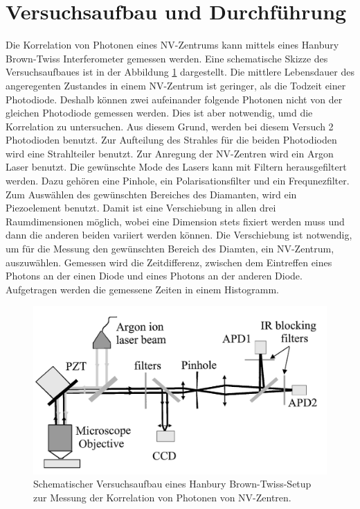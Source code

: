 \section{Versuchsaufbau und Durchf\"uhrung}
Die Korrelation von Photonen eines NV-Zentrums kann mittels eines  Hanbury Brown-Twiss Interferometer
gemessen werden. Eine schematische Skizze des Versuchsaufbaues ist in der Abbildung \ref{fig:Versuchsaufbau} dargestellt. 
Die mittlere Lebensdauer des angeregenten Zustandes in einem NV-Zentrum ist geringer, als die Todzeit einer Photodiode. 
Deshalb k\"onnen zwei aufeinander folgende Photonen nicht von der gleichen Photodiode gemessen werden. 
Dies ist aber notwendig, umd die Korrelation zu untersuchen. Aus diesem Grund, werden bei diesem Versuch 2 Photodioden benutzt. 
Zur Aufteilung des Strahles für die beiden Photodioden wird eine Strahlteiler benutzt. Zur Anregung der NV-Zentren wird ein Argon Laser benutzt. 
Die gewünschte Mode des Lasers kann mit Filtern herausgefiltert werden. Dazu gehören eine Pinhole, ein Polarisationsfilter und ein Frequnezfilter.  
Zum Ausw\"ahlen des gew\"unschten Bereiches des Diamanten, wird ein Piezoelement benutzt. 
Damit ist eine Verschiebung in allen drei Raumdimensionen m\"oglich, wobei eine Dimension stets fixiert werden muss und dann die anderen beiden variiert werden k\"onnen. 
Die Verschiebung ist notwendig, um f\"ur die Messung den gew\"unschten Bereich des Diamten, ein NV-Zentrum, auszuw\"ahlen. Gemessen wird die Zeitdifferenz, zwischen dem Eintreffen eines Photons an der einen Diode und eines Photons an der anderen Diode. 
Aufgetragen werden die gemessene Zeiten in einem Histogramm.   
\begin{figure}[H]
\centering
\includegraphics[scale=0.6]{Versuchsaufbau.PNG}
\caption{Schematischer Versuchsaufbau eines Hanbury Brown-Twiss-Setup zur Messung der Korrelation von Photonen von NV-Zentren. \cite{brouri}  }
\label{fig:Versuchsaufbau}
\end{figure}
